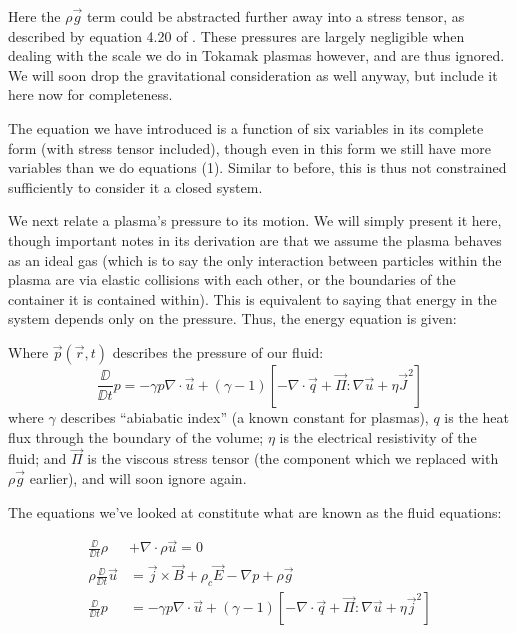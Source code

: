 \begin{remark}
    Here the $\rho \vec{g}$ term could be abstracted further away into a stress tensor, as described by equation 4.20 of \cite{mhd-lectures}. These 
    pressures are largely negligible when dealing with the scale we do in Tokamak plasmas however, and 
    are thus ignored. We will soon drop the gravitational consideration as well anyway, but include it here now for completeness.
\end{remark}

\begin{remark}
    The equation we have introduced is a function of six variables in its complete form (with stress tensor 
    included), though even in this form we still have more variables than we do equations (1). Similar to before, this 
    is thus not constrained sufficiently to consider it a closed system.
\end{remark}

We next relate a plasma's pressure to its motion. We will simply present it here, though important notes in its 
derivation are that we assume the plasma behaves as an ideal gas (which is to say the only interaction 
between particles within the plasma are via elastic collisions with each other, or the boundaries of the container 
it is contained within). This is equivalent to saying that energy in the system depends only on the pressure. Thus, the 
energy equation is given:
\begin{definition}
    Where $\vec{p}(\vec{r}, t)$ describes the pressure of our fluid:
    \begin{equation}
        \frac{\DD}{\DD t} p  = -\gamma p \nabla \cdot \vec{u} + (\gamma - 1) \left [ -\nabla \cdot \vec{q} + \vec{\Pi} : \nabla \vec{u} + \eta \vec{J}^2 \right ]
    \end{equation}
    where $\gamma$ describes ``abiabatic index'' (a known constant for plasmas), $q$ is the heat flux through 
    the boundary of the volume; $\eta$ is the electrical resistivity of the fluid; and $\vec{\Pi}$ is the viscous 
    stress tensor (the component which we replaced with $\rho \vec{g}$ earlier), and will soon ignore again. 
\end{definition}



The equations we've looked at constitute what are known as the fluid equations:

\begin{definition}
    \begin{align}
        \frac{\DD}{\DD t} \rho &+ \nabla  \cdot \rho \vec{u} = 0 \\
        \rho \frac{\DD}{\DD t} \vec{u} &=  \vec{j} \times \vec{B} + \rho_c \vec{E} - \nabla p + \rho \vec{g} \\
        \frac{\DD}{\DD t} p  &= -\gamma p \nabla \cdot \vec{u} + (\gamma - 1) \left [ -\nabla \cdot \vec{q} + \vec{\Pi} : \nabla \vec{u} + \eta \vec{j}^2 \right ]
    \end{align}
\end{definition}

